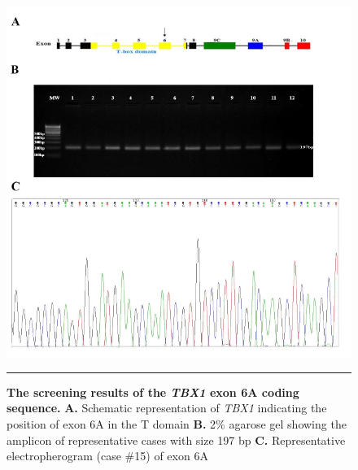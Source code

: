 \begin{refsection}
\begin{figure}[!tb]
\centering
\includegraphics[width=\linewidth]{Figures/Figure4_7TBX6A.pdf}
\rule{35em}{0.5pt}
\caption[The screening results of the \textit{TBX1} exon 6A coding sequence]{\textbf{The screening results of the \textit{TBX1} exon 6A coding sequence.}
\textbf{A.} Schematic representation of \textit{TBX1} indicating the position of exon 6A in the T domain \textbf{B.} 2\% agarose gel showing the amplicon of representative cases with size 197 bp \textbf{C.} Representative electropherogram (case \#15) of exon 6A}
\label{fig:4_7}
\end{figure}



\end{refsection}
